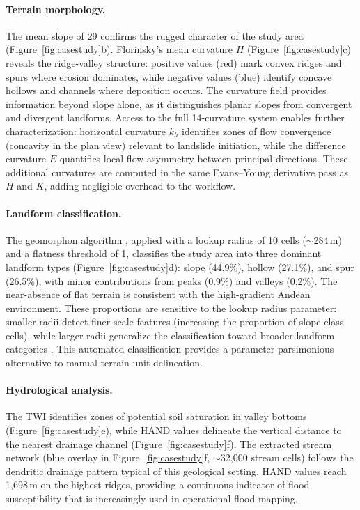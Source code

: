 \documentclass[preprint,review,12pt,authoryear]{elsarticle}
\begin{document}
\paragraph{Terrain morphology.} The mean slope of 29\textdegree{} confirms the rugged character of the study area (Figure~\ref{fig:casestudy}b). Florinsky's mean curvature $H$ (Figure~\ref{fig:casestudy}c) reveals the ridge-valley structure: positive values (red) mark convex ridges and spurs where erosion dominates, while negative values (blue) identify concave hollows and channels where deposition occurs. The curvature field provides information beyond slope alone, as it distinguishes planar slopes from convergent and divergent landforms. Access to the full 14-curvature system enables further characterization: horizontal curvature $k_h$ identifies zones of flow convergence (concavity in the plan view) relevant to landslide initiation, while the difference curvature $E$ quantifies local flow asymmetry between principal directions. These additional curvatures are computed in the same Evans--Young derivative pass as $H$ and $K$, adding negligible overhead to the workflow.

\paragraph{Landform classification.} The geomorphon algorithm \citep{jasiewicz2013}, applied with a lookup radius of 10 cells ($\sim$284\,m) and a flatness threshold of 1\textdegree, classifies the study area into three dominant landform types (Figure~\ref{fig:casestudy}d): slope (44.9\%), hollow (27.1\%), and spur (26.5\%), with minor contributions from peaks (0.9\%) and valleys (0.2\%). The near-absence of flat terrain is consistent with the high-gradient Andean environment. These proportions are sensitive to the lookup radius parameter: smaller radii detect finer-scale features (increasing the proportion of slope-class cells), while larger radii generalize the classification toward broader landform categories \citep{jasiewicz2013}. This automated classification provides a parameter-parsimonious alternative to manual terrain unit delineation.

\paragraph{Hydrological analysis.} The TWI \citep{kopecky2021} identifies zones of potential soil saturation in valley bottoms (Figure~\ref{fig:casestudy}e), while HAND values \citep{nobre2011} delineate the vertical distance to the nearest drainage channel (Figure~\ref{fig:casestudy}f). The extracted stream network (blue overlay in Figure~\ref{fig:casestudy}f, $\sim$32{,}000 stream cells) follows the dendritic drainage pattern typical of this geological setting. HAND values reach 1{,}698\,m on the highest ridges, providing a continuous indicator of flood susceptibility that is increasingly used in operational flood mapping.
\end{document}

